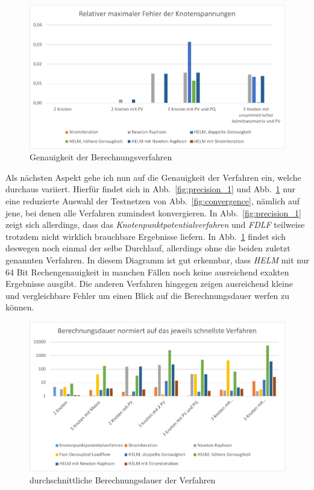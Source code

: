 \documentclass[12pt,a4paper]{article}
\newcommand{\reffig}[1]{{Abb.~\ref{#1}}}
\begin{document}
	\begin{figure}
		\centering
		\includegraphics[scale=0.8]{pictures/precision_2}
		\caption{Genauigkeit der Berechnungsverfahren}
		\label{fig:precision_2}
	\end{figure}
	
	Als nächsten Aspekt gehe ich nun auf die Genauigkeit der Verfahren ein, welche durchaus variiert. Hierfür findet sich in \reffig{fig:precision_1} und \reffig{fig:precision_2} nur eine reduzierte Auswahl der Testnetzen von \reffig{fig:convergence}, nämlich auf jene, bei denen alle Verfahren zumindest konvergieren. In \reffig{fig:precision_1} zeigt sich allerdings, dass das \emph{Knotenpunktpotentialverfahren} und \emph{FDLF} teilweise trotzdem nicht wirklich brauchbare Ergebnisse liefern. In \reffig{fig:precision_2} findet sich deswegen noch einmal der selbe Durchlauf, allerdings ohne die beiden zuletzt genannten Verfahren. In diesem Diagramm ist gut erkennbar, dass \emph{HELM} mit nur 64 Bit Rechengenauigkeit in manchen Fällen noch keine ausreichend exakten Ergebnisse ausgibt. Die anderen Verfahren hingegen zeigen ausreichend kleine und vergleichbare Fehler um einen Blick auf die Berechnungsdauer werfen zu können.
	
	\begin{figure}
		\centering
		\includegraphics[scale=0.8]{pictures/duration_mean}
		\caption{durchschnittliche Berechnungsdauer der Verfahren}
		\label{fig:duration_mean}
	\end{figure}
	
\end{document}
